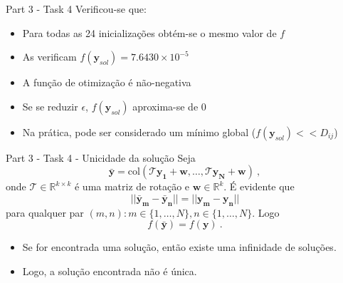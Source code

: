 \documentclass{beamer}					%
\begin{document}
\begin{frame}{Part 3 - Task 4}
	Verificou-se que:
	\begin{itemize}
		\item Para todas as 24 inicializações obtém-se o mesmo valor de $f$
		\item As verificam $f(\mathbf{y}_{sol}) = 7.6430\times 10^{-5}$
		\item A função de otimização é não-negativa
		\item Se se reduzir $\epsilon$, $f(\mathbf{y}_{sol})$ aproxima-se de 0
		\item Na prática, pode ser considerado um mínimo global ($f(\mathbf{y}_{sol})<< D_{ij}$)
		\end{itemize}
\end{frame}

\begin{frame}{Part 3 - Task 4 - Unicidade da solução}
	Seja
	\begin{equation*}\label{key}
	\bar{\mathbf{y}} = \mathrm{col}(\mathcal{T}\mathbf{y_1}+\mathbf{w},\ldots,\mathcal{T}\mathbf{y_N}+\mathbf{w})\:,
	\end{equation*}
onde $\mathcal{T} \in \mathbb{R}^{k\times k}$ é uma matriz de rotação e $\mathbf{w}\in\mathbb{R}^{k}$. É evidente que
	\begin{equation*}\label{key}
	||\mathbf{\bar{y}_m}-{\mathbf{\bar{y}_n}}|| = ||\mathbf{y_m}-\mathbf{y_n}||
	\end{equation*}
	para qualquer par $(m,n):m \in \{1,\ldots,N\}, n \in \{1,\ldots,N\}$. Logo
	\begin{equation*}\label{key}
	f(\mathbf{\bar{y}}) = f(\mathbf{y})\:.
	\end{equation*}
	\begin{itemize}
		\item Se for encontrada uma solução, então existe uma infinidade de soluções.
		\item Logo, a solução encontrada não é única.
	\end{itemize}
\end{frame}
\end{document}
